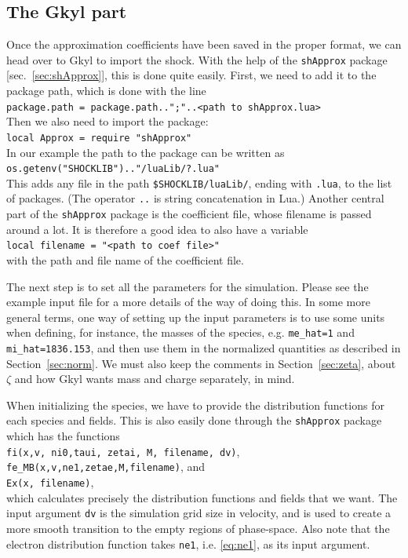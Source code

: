 \documentclass[11pt,a4paper, 
swedish, english %
]{article}
\begin{document}
\subsection{The Gkyl part}
Once the approximation coefficients have been saved in the proper
format, we can head over to Gkyl to import the shock. With the help of
the \texttt{shApprox} package [sec.~\ref{sec:shApprox}], this is done
quite easily. First, we need to add it to the package path, which is
done with the line\\
\indent\texttt{package.path = package.path..";"..<path to shApprox.lua>}\\
Then we also need to import the package:\\
\indent\texttt{local Approx = require "shApprox"}\\
In our example the path to the package can be written as\\
\indent\texttt{os.getenv("SHOCKLIB").."/luaLib/?.lua"}\\
This adds any file in the path
\texttt{\$SHOCKLIB/luaLib/}, ending with
\texttt{.lua}, to the list of packages. (The operator \texttt{..} is
string concatenation in Lua.)
Another central part of the \texttt{shApprox} package is the
coefficient file, whose filename is passed around a lot. It is
therefore a good idea to also have a variable\\
\indent\texttt{local filename = "<path to coef file>"}\\
with the path and file name of the coefficient file.

The next step is to set all the parameters for the simulation. Please
see the example input file for a more details of the way of doing
this. In some more general terms, one way of setting up the input
parameters is to use some units when defining, for instance, the masses
of the species, e.g. \texttt{me\_hat=1} and \texttt{mi\_hat=1836.153},
and then use them in the normalized quantities as described in
Section~\ref{sec:norm}. We must also keep the comments in
Section~\ref{sec:zeta}, about $\zeta$ and how Gkyl wants mass and
charge separately, in mind.

When initializing the species, we have to provide the distribution
functions for each species and fields. This is also easily done
through the \texttt{shApprox} package which has the functions\\
\indent\texttt{fi(x,v, ni0,taui, zetai, M, filename, dv)},\\
\indent\texttt{fe\_MB(x,v,ne1,zetae,M,filename)}, and\\
\indent\texttt{Ex(x, filename)},\\
which calculates precisely the distribution functions and fields that
we want. The input argument \texttt{dv} is the simulation grid size in
velocity, and is used to create a more smooth transition to the empty
regions of phase-space. Also note that the electron distribution
function takes \texttt{ne1}, i.e. \eqref{eq:ne1}, as its input
argument.  
\end{document}
